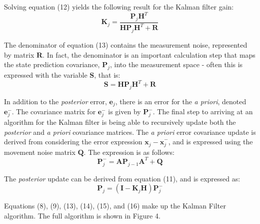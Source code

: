 \documentclass[a4paper]{article}
\begin{document}
Solving equation (12) yields the following result for the Kalman filter gain:
\begin{equation}
\mathbf{K}_j = \frac{\mathbf{P}_j \mathbf{H}^T}{\mathbf{H} \mathbf{P}_j \mathbf{H}^T + \mathbf{R}}
\end{equation}

The denominator of equation (13) contains the measurement noise, represented by matrix $\mathbf{R}$. In fact, the denominator is an important calculation step that maps the state prediction covariance, $\mathbf{P}_j$, into the measurement space - often this is expressed with the variable $\mathbf{S}$, that is:
\begin{equation}
\mathbf{S} = \mathbf{H} \mathbf{P}_j \mathbf{H}^T + \mathbf{R} 
\end{equation}

In addition to the \textit{posterior} error, $\mathbf{e}_j$, there is an error for the \textit{a priori}, denoted $\mathbf{e}^-_j$. The covariance matrix for $\mathbf{e}^-_j$ is given by $\mathbf{P}^-_j$. The final step to arriving at an algorithm for the Kalman filter is being able to recursively update both the \textit{posterior} and \textit{a priori} covariance matrices. The \textit{a priori} error covariance update is derived from considering the error expression $\mathbf{x}_j - \hat{\mathbf{x}}^-_j$, and is expressed using the movement noise matrix $\mathbf{Q}$. The expression is as follows:
\begin{equation}
\mathbf{P}^-_j = \mathbf{A} \mathbf{P}_{j-1} \mathbf{A}^T + \mathbf{Q}
\end{equation}

The \textit{posterior} update can be derived from equation (11), and is expressed as:
\begin{equation}
\mathbf{P}_j = (\mathbf{I} - \mathbf{K}_j \mathbf{H}) \mathbf{P}^-_j
\end{equation}

Equations (8), (9), (13), (14), (15), and (16) make up the Kalman Filter algorithm. The full algorithm is shown in Figure 4.
\end{document}
